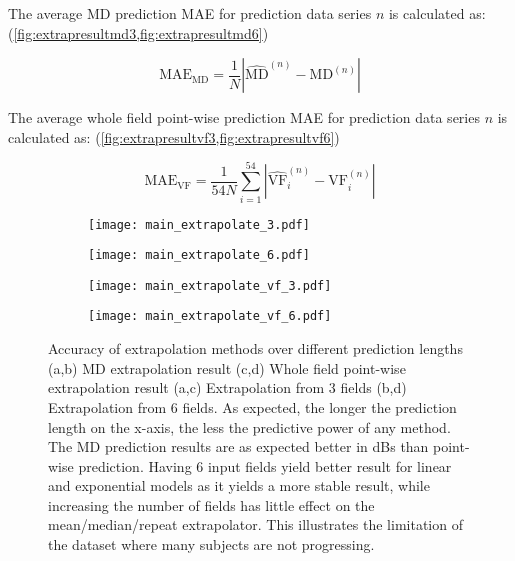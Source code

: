 The average \ac{MD} prediction \ac{MAE} for prediction data series $n$ is calculated as: (\cref{fig:extrapresultmd3,fig:extrapresultmd6})

\begin{equation}
\textrm{MAE}_{\textrm{MD}} = \frac{1}{N}\left|\widehat{\textrm{MD}}^{(n)}-\textrm{MD}^{(n)} \right|
\end{equation}

The average whole field point-wise prediction \ac{MAE} for prediction data series $n$ is calculated as: (\cref{fig:extrapresultvf3,fig:extrapresultvf6})

\begin{equation}
\textrm{MAE}_{\textrm{VF}} = \frac{1}{54N}\sum_{i=1}^{54}\left|\widehat{\textrm{VF}}_i^{(n)}-\textrm{VF}_i^{(n)} \right|
\end{equation}

\begin{figure}[t!]
	\centering
	\begin{subfigure}{0.49\textwidth}
		\centering
		\texttt{[image: main\_extrapolate\_3.pdf]}
		\caption{}
		\label{fig:extrapresultmd3}
	\end{subfigure}
	\begin{subfigure}{0.49\textwidth}
		\centering
		\texttt{[image: main\_extrapolate\_6.pdf]}
		\caption{}
		\label{fig:extrapresultmd6}
	\end{subfigure}

	\hfill
	
	\begin{subfigure}{0.49\textwidth}
		\centering
		\texttt{[image: main\_extrapolate\_vf\_3.pdf]}
		\caption{}
		\label{fig:extrapresultvf3}
	\end{subfigure}
	\begin{subfigure}{0.49\textwidth}
		\centering
		\texttt{[image: main\_extrapolate\_vf\_6.pdf]}
		\caption{}
		\label{fig:extrapresultvf6}
	\end{subfigure}

	\caption[Accuracy of extrapolation methods over different prediction lengths on the Rotterdam dataset]{Accuracy of extrapolation methods over different prediction lengths (a,b) MD extrapolation result (c,d) Whole field point-wise extrapolation result (a,c) Extrapolation from 3 fields (b,d) Extrapolation from 6 fields. As expected, the longer the prediction length on the x-axis, the less the predictive power of any method. The MD prediction results are as expected better in dBs than point-wise prediction. Having 6 input fields yield better result for linear and exponential models as it yields a more stable result, while increasing the number of fields has little effect on the mean/median/repeat extrapolator. This illustrates the limitation of the dataset where many subjects are not progressing. }
	\label{fig:extrapresult}

\end{figure}


